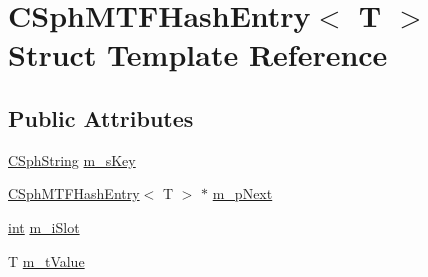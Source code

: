 \hypertarget{structCSphMTFHashEntry}{\section{C\-Sph\-M\-T\-F\-Hash\-Entry$<$ T $>$ Struct Template Reference}
\label{structCSphMTFHashEntry}
}
\subsection*{Public Attributes}
\begin{DoxyCompactItemize}
\item 
\hyperlink{structCSphString}{C\-Sph\-String} \hyperlink{structCSphMTFHashEntry_a42d93281868c9bb009e995bb92cc3da8}{m\-\_\-s\-Key}
\item 
\hyperlink{structCSphMTFHashEntry}{C\-Sph\-M\-T\-F\-Hash\-Entry}$<$ T $>$ $\ast$ \hyperlink{structCSphMTFHashEntry_a00c7a217756e5c37857a2eef3e744641}{m\-\_\-p\-Next}
\item 
\hyperlink{sphinxexpr_8cpp_a4a26e8f9cb8b736e0c4cbf4d16de985e}{int} \hyperlink{structCSphMTFHashEntry_a4f27793d9854ac4165417b2a3a63d944}{m\-\_\-i\-Slot}
\item 
T \hyperlink{structCSphMTFHashEntry_af337a7b77ab3aacdcd7989dd1978e199}{m\-\_\-t\-Value}
\end{DoxyCompactItemize}


